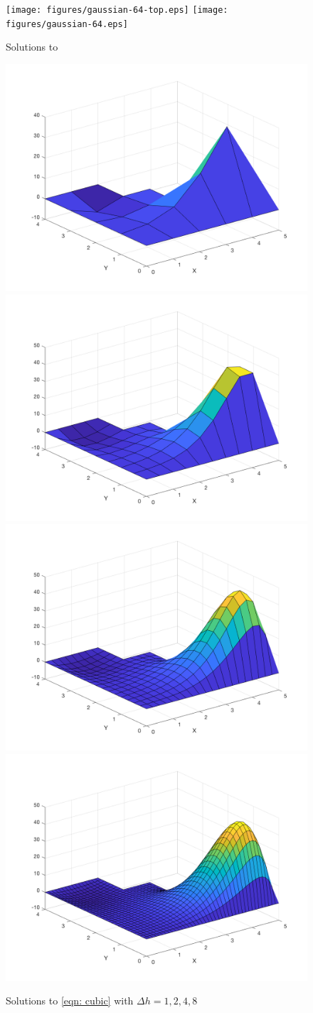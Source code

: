 \documentclass[10pt,a4paper]{article}
\begin{document}
\begin{figure}[H]
\texttt{[image: figures/gaussian-64-top.eps]}
\texttt{[image: figures/gaussian-64.eps]}
\caption{Solutions to }
\label{fig: gaussian solutions}
\end{figure}


\begin{figure}[H]
\includegraphics[width=0.5\linewidth]{figures/eqTwosizeOne.png}
\includegraphics[width=0.5\linewidth]{figures/eqTwosizeHalf.png}
\includegraphics[width=0.5\linewidth]{figures/eqTwosizeQuarter.png}
\includegraphics[width=0.5\linewidth]{figures/eqTwosizeEighth.png}
\caption{Solutions to \cref{eqn: cubic} with $\Delta h = 1, 2, 4, 8$}
\label{fig: steps}
\end{figure}
\end{document}
